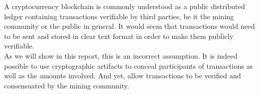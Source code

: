 

A cryptocurrency blockchain is commonly understood as a public distributed ledger containing transactions 
verifiable by third parties, be it the mining community or the public in general.
It would seem that transactions would need to be sent and stored in clear text format in order to
make them publicly verifiable.
\\

As we will show in this report, this is an incorrect assumption. It is indeed possible to use cryptographic
artifacts to conceal participants of transactions as well as the amounts involved. And yet, allow transactions
to be verified and consensuated by the mining community.





